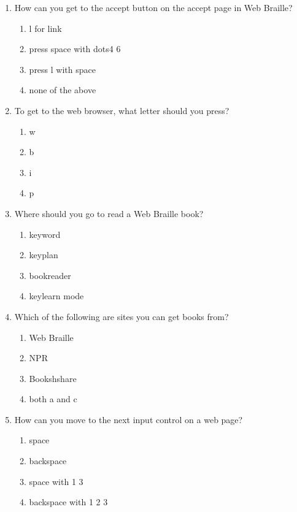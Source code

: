 \documentclass[10pt,letterpaper,twoside]{report}
\begin{document}
{{{\begin{enumerate}
\begin{enumerate}
		      \item space with backspace
	      \end{enumerate}
	\item How can you get to the accept button on the accept page in Web Braille?
	      \begin{enumerate}
		      \item l for link
		      \item press space with dots4 6
		      \item press l with space
		      \item none of the above
	      \end{enumerate}
	\item To get to the web browser, what letter should you press?
	      \begin{enumerate}
		      \item w
		      \item b
		      \item i
		      \item p
	      \end{enumerate}
	\item Where should you go to read a Web Braille book?
	      \begin{enumerate}
		      \item keyword
		      \item keyplan
		      \item bookreader
		      \item keylearn mode
	      \end{enumerate}
	\item Which of the following are sites you can get books from?
	      \begin{enumerate}
		      \item Web Braille
		      \item NPR
		      \item Bookshshare
		      \item both a and c
	      \end{enumerate}
	\item How can you move to the next input control on a web page?
	      \begin{enumerate}
		      \item space
		      \item backspace
		      \item space with 1 3
		      \item backspace with 1 2 3
	      \end{enumerate}
\end{enumerate}

}}}
\end{document}
